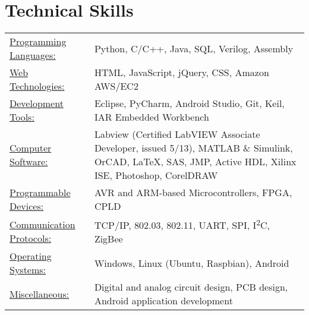 \documentclass[10pt]{article}
\newlength{\WidthSkills}
\newlength{\WidthSkills}
\begin{document}
\section{Technical Skills}

\begin{flushleft}

\begin{tabular}{l p{\WidthSkills}}
    \underline{Programming Languages:} & Python, C/C++, Java, SQL, Verilog, Assembly \\
    \underline{Web Technologies:} & HTML, JavaScript, jQuery, CSS, Amazon AWS/EC2 \\
    \underline{Development Tools:} & Eclipse, PyCharm, Android Studio, Git, Keil, IAR Embedded Workbench \\
    \underline{Computer Software:} & Labview (Certified LabVIEW Associate Developer, issued 5/13), MATLAB \& Simulink, OrCAD, \LaTeX, SAS, JMP, Active HDL, Xilinx ISE, Photoshop, CorelDRAW \\
    \underline{Programmable Devices:} & AVR and ARM-based Microcontrollers, FPGA, CPLD \\
    \underline{Communication Protocols:} & TCP/IP, 802.03, 802.11, UART, SPI, I\textsuperscript{2}C, ZigBee \\
    \underline{Operating Systems:} & Windows, Linux (Ubuntu, Raspbian), Android \\
    \underline{Miscellaneous:} & Digital and analog circuit design, PCB design, Android application development
\end{tabular}

\end{flushleft}
\end{document}
